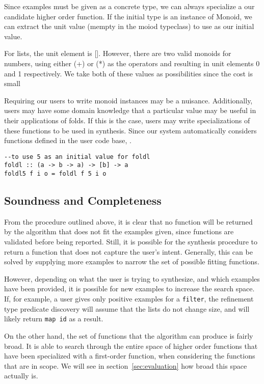 Since examples must be given as a concrete type, we can always specialize a our candidate higher order function. If the initial type is an instance of Monoid, we can extract the unit value (mempty in the moiod typeclass) to use as our initial value. 

For lists, the unit element is []. However, there are two valid monoids for numbers, using either (+) or (*) as the operators and resulting in unit elements 0 and 1 respectively. We take both of these values as possibilities since the cost is small 

Requiring our users to write monoid instances may be a nuisance. Additionally, users may have some domain knowledge that a particular value may be useful in their applications of folds. If this is the case, users may write specializations of these functions to be used in synthesis. Since our system automatically considers functions defined in the user code base, .

\begin{verbatim}
--to use 5 as an initial value for foldl
foldl :: (a -> b -> a) -> [b] -> a
foldl5 f i o = foldl f 5 i o
\end{verbatim}


\subsection{Soundness and Completeness}

From the procedure outlined above, it is clear that no function will be returned by the algorithm that does not fit the examples given, since functions are validated before being reported. Still, it is possible for the synthesis procedure to return a function that does not capture the user's intent. Generally, this can be solved by supplying more examples to narrow the set of possible fitting functions.

However, depending on what the user is trying to synthesize, and which examples have been provided, it is possible for new examples to increase the search space. If, for example, a user gives only positive examples for a \texttt{filter}, the refinement type predicate discovery will assume that the lists do not change size, and will likely return \texttt{map id} as a result.

On the other hand, the set of functions that the algorithm can produce is fairly broad. It is able to search through the entire space of higher order functions that have been specialized with a first-order function, when considering the functions that are in scope. We will see in section~\ref{sec:evaluation} how broad this space actually is.
